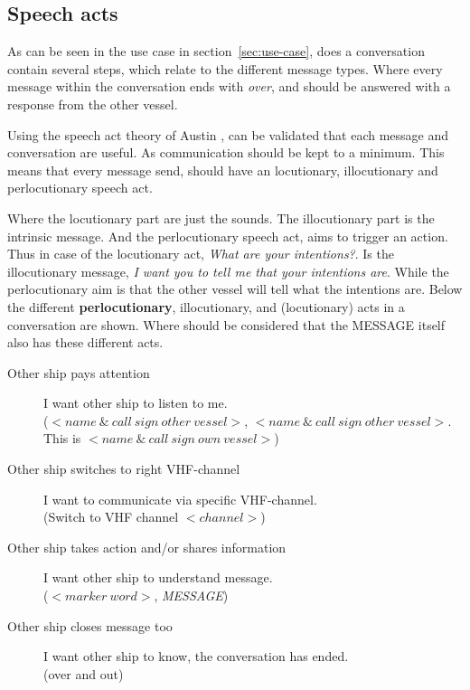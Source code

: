 \subsection{Speech acts}
As can be seen in the use case in section~\ref{sec:use-case}, does a conversation contain several steps, which relate to the different message types. Where every message within the conversation ends with \emph{over}, and should be answered with a response from the other vessel.

Using the speech act theory of Austin \cite{Austin1975}, can be validated that each message and conversation are useful. As communication should be kept to a minimum. This means that every message send, should have an locutionary, illocutionary and perlocutionary speech act.

Where the locutionary part are just the sounds. The illocutionary part is the intrinsic message. And the perlocutionary speech act, aims to trigger an action. Thus in case of the locutionary act, \emph{What are your intentions?}. Is the illocutionary message, \emph{I want you to tell me that your intentions are}. While the perlocutionary aim is that the other vessel will tell what the intentions are.
Below the different \textbf{perlocutionary}, illocutionary, and (locutionary) acts in a conversation are shown. Where should be considered that the MESSAGE itself also has these different acts.

\begin{description}
	\item[Other ship pays attention] I want other ship to listen to me.\\ ($<name~\&~call~sign~other~vessel>$, $<name~\&~call~sign~other~vessel>$. This is $<name~\&~call~sign~own~vessel>$)
	\item[Other ship switches to right VHF-channel] I want to communicate via specific VHF-channel.\\ (Switch to VHF channel $<channel>$)
	\item[Other ship takes action and/or shares information] I want other ship to understand message.\\ ($<marker~word>$, \emph{MESSAGE})
	\item[Other ship closes message too] I want other ship to know, the conversation has ended.\\ (over and out)
\end{description}

